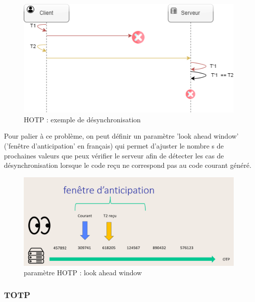 \documentclass[a4paper, 10pt]{article}
\newcommand{\totp}{\textsc{TOTP} }
\newcommand{\hotp}{\textsc{HOTP} }
\begin{document}
\begin{figure}[H]
        \centering
        \includegraphics[scale=0.80]{img/1/2/hotp-desync.drawio.png}
        \caption{\hotp : exemple de désynchronisation\\}
        \label{fig:hotp-desync}
\end{figure}

    Pour palier à ce problème, on peut définir un \textcolor{mygreen}{paramètre 'look ahead window'} ('fenêtre d'anticipation' en français) qui permet d'ajuster \textcolor{myblue}{le nombre s de prochaines valeurs} que peux vérifier le serveur afin de \textcolor{mygreen}{détecter les cas de désynchronisation} lorsque le code reçu ne correspond pas au code courant généré. 

\begin{figure}[H]
        \centering
        \includegraphics[scale=0.40]{img/1/2/hotp-param-look_ahead_window.png}
        \caption{paramètre \hotp :  look ahead window\\}
        \label{fig:hotp-param-look_ahead_window}
\end{figure}





            \subsubsection{\totp}
\end{document}
